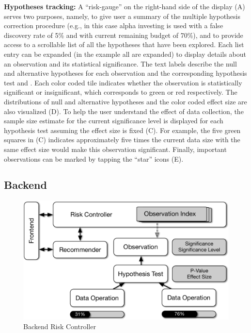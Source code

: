\textbf{Hypotheses tracking:} A ``risk-gauge'' on the right-hand side of the display (A) serves two purposes, namely, to give user a summary of the multiple hypothesis correction procedure (e.g., in this case alpha investing is used with a false discovery rate of 5\% and with current remaining budget of 70\%), and to provide access to a scrollable list of all the hypotheses that have been explored.
Each list entry can be expanded (in the example all are expanded) to display details about an observation and its statistical significance.  
The text labels describe the null and alternative hypotheses for each observation and the corresponding hypothesis test and \pval{}. Each color coded tile indicates whether the observation is statistically significant or insignificant, which corresponds to green or red respectively.  
The distributions of null and alternative hypotheses and the color coded effect size are also visualized (D).  
To help the user understand the effect of data collection, the sample size estimate for the current significance level is displayed for each hypothesis test assuming the effect size is fixed (C).  
For example, the five green squares in (C) indicates approximately five times the current data size with the same effect size would make this observation significant.
Finally, important observations can be marked by tapping the ``star'' icons (E). 

\subsection{Backend}
\label{sec:backend}

\begin{figure}
\centering
\includegraphics[scale=0.4]{figures/risk-controller.pdf}
\caption{Backend Risk Controller}
\label{fig:backend}	
\end{figure}

